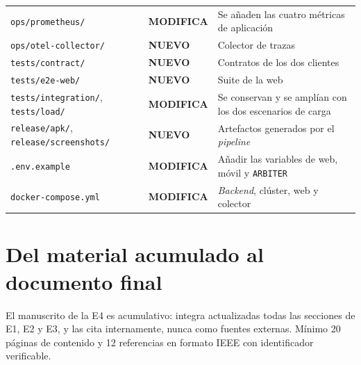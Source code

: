 \documentclass[11pt,a4paper]{article}
\newcommand{\cambia}{\cellcolor{filaCambia}\textbf{MODIFICA}}
\newcommand{\nuevo}{\cellcolor{filaNuevo}\textbf{NUEVO}}
\begin{document}
\begin{center}
\begin{longtable}{@{}p{5.4cm}p{1.9cm}p{7.5cm}@{}}
		\texttt{ops/prometheus/} & \cambia & Se añaden las cuatro métricas de aplicación \\
		\texttt{ops/otel-collector/} & \nuevo & Colector de trazas \\
		\texttt{tests/contract/} & \nuevo & Contratos de los dos clientes \\
		\texttt{tests/e2e-web/} & \nuevo & Suite de la web \\
		\texttt{tests/integration/},\allowbreak{} \texttt{tests/load/} & \cambia & Se conservan y se amplían con los dos escenarios de carga \\
		\texttt{release/apk/},\allowbreak{} \texttt{release/screenshots/} & \nuevo & Artefactos generados por el \emph{pipeline} \\
		\texttt{.env.example} & \cambia & Añadir las variables de web, móvil y \texttt{ARBITER} \\
		\texttt{docker-compose.yml} & \cambia & \emph{Backend}, clúster, web y colector \\
		\bottomrule
	\end{longtable}
\end{center}

\section{Del material acumulado al documento final}

El manuscrito de la E4 es acumulativo: integra actualizadas todas las secciones de E1, E2 y E3, y las cita internamente, nunca como fuentes externas. Mínimo 20 páginas de contenido y 12 referencias en formato IEEE con identificador verificable.
\end{document}
